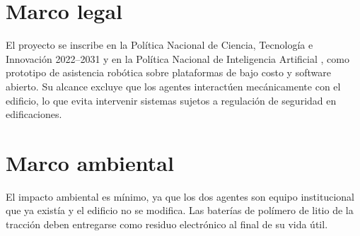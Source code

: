 \section{Marco legal}
\label{sec:legal}

El proyecto se inscribe en la Política Nacional de Ciencia, Tecnología e Innovación 2022--2031 \autocite{conpes4069} y en la Política Nacional de Inteligencia Artificial \autocite{conpes4144}, como prototipo de asistencia robótica sobre plataformas de bajo costo y software abierto. Su alcance excluye que los agentes interactúen mecánicamente con el edificio, lo que evita intervenir sistemas sujetos a regulación de seguridad en edificaciones.

\section{Marco ambiental}
\label{sec:ambiental}

El impacto ambiental es mínimo, ya que los dos agentes son equipo institucional que ya existía y el edificio no se modifica. Las baterías de polímero de litio de la tracción deben entregarse como residuo electrónico al final de su vida útil.
